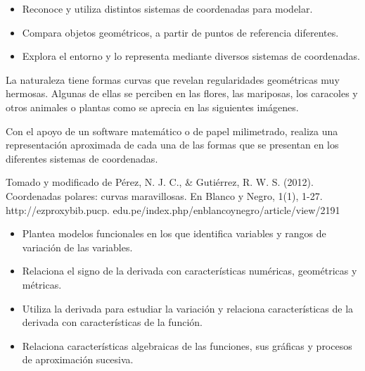 \begin{itemize}
  \item Reconoce y utiliza distintos sistemas de coordenadas para modelar.
  \item Compara objetos geométricos, a partir de puntos de referencia diferentes.
  \item Explora el entorno y lo representa mediante diversos sistemas de coordenadas.
\end{itemize}

\ejemplo

La naturaleza tiene formas curvas que revelan regularidades geométricas muy hermosas. Algunas de ellas se perciben en las flores, las mariposas, los caracoles y otros animales o plantas como se aprecia en las siguientes imágenes.


Con el apoyo de un software matemático o de papel milimetrado, realiza una representación aproximada de cada una de las formas que se presentan en los diferentes sistemas de coordenadas.

Tomado y modificado de Pérez, N. J. C., \& Gutiérrez, R. W. S. (2012). Coordenadas polares: curvas maravillosas. En Blanco y Negro, 1(1), 1-27. http://ezproxybib.pucp. edu.pe/index.php/enblancoynegro/article/view/2191


\evidencias

\begin{itemize}
  \item Plantea modelos funcionales en los que identifica variables y rangos de variación de las variables.
  \item Relaciona el signo de la derivada con características numéricas, geométricas y métricas.
  \item Utiliza la derivada para estudiar la variación y relaciona características de la derivada con características de la función.
  \item Relaciona características algebraicas de las funciones, sus gráficas y procesos de aproximación sucesiva.
\end{itemize}

\ejemplo

